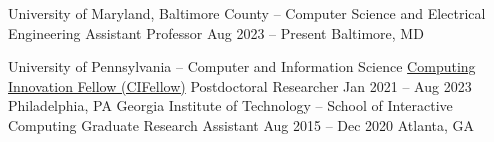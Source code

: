 {\color{black}\fontsize{12pt}{1em}} 


\begin{cventries}


  \cventry
    {University of Maryland, Baltimore County -- Computer Science and Electrical Engineering} %
    {Assistant Professor} %
    {Aug 2023 – Present} %
    {Baltimore, MD} %
    {
    }

  \cventry
    {University of Pennsylvania -- Computer and Information Science} %
    {\href{https://cifellows2020.org/}{Computing Innovation Fellow (CIFellow)} Postdoctoral Researcher} %
    {Jan 2021 – Aug 2023} %
    {Philadelphia, PA} %
    {
    }
  \cventry
    {Georgia Institute of Technology -- School of Interactive Computing} %
    {Graduate Research Assistant} %
    {Aug 2015 – Dec 2020} %
    {Atlanta, GA} %
    {
    }


\end{cventries}

